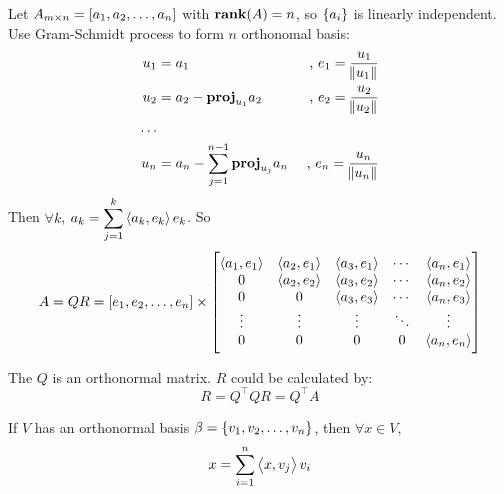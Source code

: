 \begin{theorem}
    Let $A_{m \times n} = \rowvector{a_1, a_2, \dots, a_n}$ with $\rank{A} = n$, so $\set{a_i}$ is linearly independent. Use Gram-Schmidt process to form $n$ orthonomal basis:
    \begin{equation*}
        \begin{aligned}
            u_1 &= a_1 & \text{ , } e_1 = \frac{u_1}{\norm{u_1}} \\
            u_2 &= a_2 - \projection{a_2}{u_1} & \text{ , } e_2 = \frac{u_2}{\norm{u_2}} \\
            \dots \\
            u_n &= a_n - \sum_{j=1}^{n-1} \projection{a_n}{u_j} & \text{ , } e_n = \frac{u_n}{\norm{u_n}} 
        \end{aligned}
    \end{equation*}
    Then $\forall k$, $\displaystyle a_k = \sum_{j=1}^k \innerproduct{a_k}{e_k} e_k$. So
    \begin{equation}
        A = QR = [e_1, e_2, \dots, e_n] \times \begin{bmatrix}
            \innerproduct{a_1}{e_1} & \innerproduct{a_2}{e_1} & \innerproduct{a_3}{e_1} & \cdots & \innerproduct{a_n}{e_1}\\
            0 & \innerproduct{a_2}{e_2} & \innerproduct{a_3}{e_2} & \cdots & \innerproduct{a_n}{e_2}\\
            0 & 0 & \innerproduct{a_3}{e_3} & \cdots & \innerproduct{a_n}{e_3} \\            
            \vdots & \vdots & \vdots & \ddots & \vdots \\
            0 & 0 & 0 & 0 & \innerproduct{a_n}{e_n}
        \end{bmatrix}
    \end{equation}
    
    The $Q$ is an orthonormal matrix. $R$ could be calculated by:
    \begin{equation}
        R = Q^\top Q R = Q^\top A
    \end{equation}
\end{theorem}


\begin{theorem}\label{vectorinorthonormalbasis}
	If $V$ has an orthonormal basis $\beta=\set{v_1,v_2,\dots,v_n}$, then $\forall x\in V$, 
	\begin{equation}
		x = \sum_{i=1}^n \innerproduct{x}{v_j} v_i
	\end{equation}
\end{theorem}

